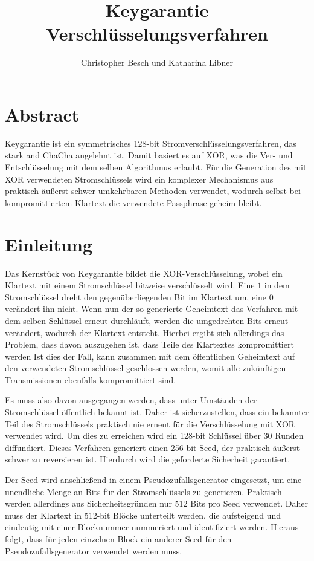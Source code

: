 \documentclass[10pt,a4paper]{article}
\author{Christopher Besch und Katharina Libner}
\title{Keygarantie Verschlüsselungsverfahren}
\begin{document}
\maketitle
\tableofcontents
\newpage

\section{Abstract}

Keygarantie ist ein symmetrisches 128-bit Stromverschlüsselungsverfahren, das stark and ChaCha angelehnt ist\cite{Bernstein2008}.
Damit basiert es auf XOR, was die Ver- und Entschlüsselung mit dem selben Algorithmus erlaubt.
Für die Generation des mit XOR verwendeten Stromschlüssels wird ein komplexer Mechanismus aus praktisch äußerst schwer umkehrbaren Methoden verwendet, wodurch selbst bei kompromittiertem Klartext die verwendete Passphrase geheim bleibt.

\section{Einleitung}

Das Kernstück von Keygarantie bildet die XOR-Verschlüsselung, wobei ein Klartext mit einem Stromschlüssel bitweise verschlüsselt wird.
Eine $1$ in dem Stromschlüssel dreht den gegenüberliegenden Bit im Klartext um, eine $0$ verändert ihn nicht.
Wenn nun der so generierte Geheimtext das Verfahren mit dem selben Schlüssel erneut durchläuft, werden die umgedrehten Bits erneut verändert, wodurch der Klartext entsteht.
Hierbei ergibt sich allerdings das Problem, dass davon auszugehen ist, dass Teile des Klartextes kompromittiert werden
Ist dies der Fall, kann zusammen mit dem öffentlichen Geheimtext auf den verwendeten Stromschlüssel geschlossen werden, womit alle zukünftigen Transmissionen ebenfalls kompromittiert sind.

\medskip
Es muss also davon ausgegangen werden, dass unter Umständen der Stromschlüssel öffentlich bekannt ist.
Daher ist sicherzustellen, dass ein bekannter Teil des Stromschlüssels praktisch nie erneut für die Verschlüsselung mit XOR verwendet wird.
Um dies zu erreichen wird ein 128-bit Schlüssel über 30 Runden diffundiert.
Dieses Verfahren generiert einen 256-bit Seed, der praktisch äußerst schwer zu reversieren ist.
Hierdurch wird die geforderte Sicherheit garantiert.

\medskip
Der Seed wird anschließend in einem Pseudozufallsgenerator eingesetzt, um eine unendliche Menge an Bits für den Stromschlüssels zu generieren.
Praktisch werden allerdings aus Sicherheitsgründen nur 512 Bits pro Seed verwendet.
Daher muss der Klartext in 512-bit Blöcke unterteilt werden, die aufsteigend und eindeutig mit einer Blocknummer nummeriert und identifiziert werden.
Hieraus folgt, dass für jeden einzelnen Block ein anderer Seed für den Pseudozufallsgenerator verwendet werden muss.
\end{document}
